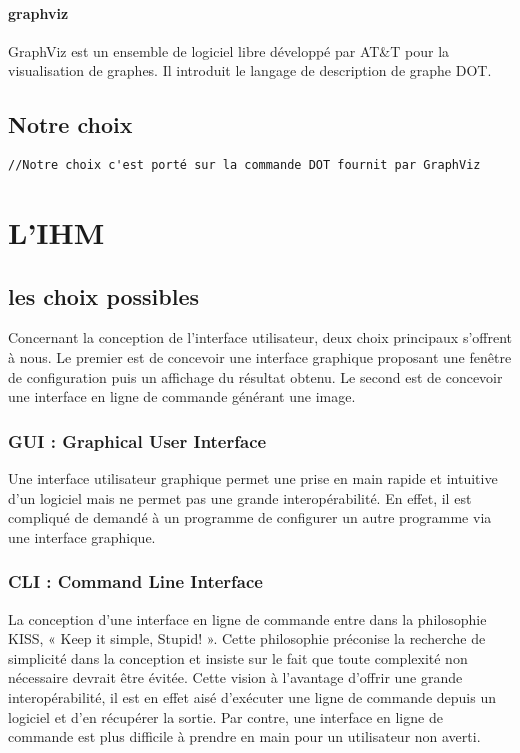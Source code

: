 		\paragraph{graphviz}
			GraphViz est un ensemble de logiciel libre développé par AT\&T pour la visualisation de graphes. Il introduit le langage de description de graphe DOT.
				
  \subsection{Notre choix}
		\verb+//Notre choix c'est porté sur la commande DOT fournit par GraphViz+


\section{L'IHM}	
	\subsection{les choix possibles}
	\label{ihm_choix_possibles}
		Concernant la conception de l'interface utilisateur, deux choix principaux s'offrent à nous. Le premier est de concevoir
une interface graphique proposant une fenêtre de configuration puis un affichage du résultat obtenu. Le second est de concevoir 	une interface en ligne de commande générant une image. 	
	
		\subsubsection{GUI : \og Graphical User Interface \fg{}}
			Une interface utilisateur graphique permet une prise en main rapide et intuitive d'un logiciel mais ne permet pas une grande interopérabilité. En effet, il est compliqué de demandé à un programme de configurer un autre programme via une interface graphique.
			
		\subsubsection{CLI : \og Command Line Interface \fg{}}
			La conception d'une interface en ligne de commande entre dans la philosophie KISS, « Keep it simple, Stupid! ». Cette philosophie préconise la recherche de simplicité dans la conception et insiste sur le fait que toute complexité non nécessaire devrait être évitée. Cette vision à l'avantage d'offrir une grande interopérabilité, il est en effet aisé d'exécuter une ligne de commande depuis un logiciel et d'en récupérer la sortie. Par contre, une interface en ligne de commande est plus difficile à prendre en main pour un utilisateur non averti.  
			
